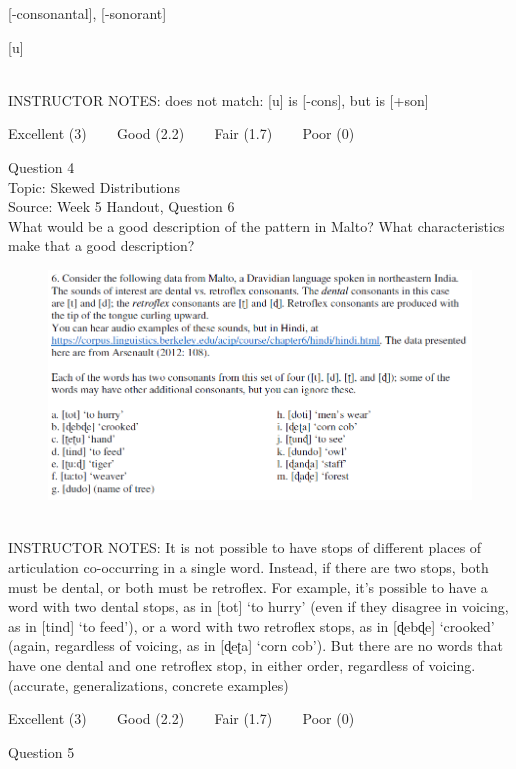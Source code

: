 \documentclass[12pt]{article}
\begin{document}
{[-consonantal]}, {[-sonorant]}

{[u]}


~\\
INSTRUCTOR NOTES: does not match: [u] is [-cons], but is [+son]


\vfill
Excellent (3) ~~~ Good (2.2) ~~~ Fair (1.7) ~~~ Poor (0)
\newpage

{\large Question 4}\\

Topic: Skewed Distributions\\
Source: Week 5 Handout, Question 6\\

What would be a good description of the pattern in Malto? What characteristics make that a good description?\\

\begin{figure}[H]
\includegraphics{../images/malto.png}
\end{figure}

~\\
INSTRUCTOR NOTES: It is not possible to have stops of different places of articulation co-occurring in a single word. Instead, if there are two stops, both must be dental, or both must be retroflex. For example, it’s possible to have a word with two dental stops, as in [tot] ‘to hurry’ (even if they disagree in voicing, as in [tind] ‘to feed’), or a word with two retroflex stops, as in [ɖebɖe] ‘crooked’ (again, regardless of voicing, as in [ɖeʈa] ‘corn cob’). But there are no words that have one dental and one retroflex stop, in either order, regardless of voicing. (accurate, generalizations, concrete examples)


\vfill
Excellent (3) ~~~ Good (2.2) ~~~ Fair (1.7) ~~~ Poor (0)
\newpage

{\large Question 5}\\
\end{document}
